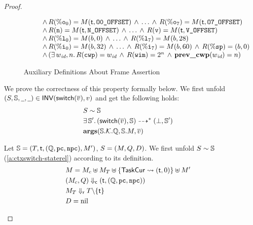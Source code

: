 \begin{proof}
\begin{enumerate}
\begin{figure}[!t]
\[\begin{array}{lcl}
                    & & \, \land \, 
                    R(\%\texttt{o}_{0}) = M(\textsf{t}, \texttt{O0\_OFFSET}) \, \land \, \dots \, \land \, 
                    R(\%\texttt{o}_{7}) = M(\textsf{t}, \texttt{O7\_OFFSET})  \\
                    & & \, \land \, 
                    R(\texttt{n}) = M(\textsf{t}, \texttt{N\_OFFSET}) \, \land \, \dots \, \land \, 
                    R(\texttt{v}) = M(\textsf{t}, \texttt{V\_OFFSET}) \\
                    & & \, \land \, 
                    R(\%\texttt{l}_{0}) = M(b, 0) \, \land \, \dots \, \land \, 
                    R(\%\texttt{l}_{7}) = M(b, 28) \\
                    & & \, \land \, 
                    R(\%\texttt{i}_{0}) = M(b, 32) \, \land \, \dots \, \land \, 
                    R(\%\texttt{i}_{7}) = M(b, 60) \, \land \, 
                    R(\%\texttt{sp}) = (b, 0) \\
                    & & \, \land \, 
                    (\exists \, w_{\textit{id}}, n. \, R(\texttt{cwp}) = w_{\textit{id}} \, \land \, 
                    R(\texttt{wim}) = 2^n \, \land \, \textbf{prev\_cwp}{(w_{\textit{id}})} = n)  
                \end{array}
            \]
            \caption{Auxiliary Definitions About Frame Assertion}
        \end{figure}

        We prove the correctness of this property formally
        below. We first unfold 
        $(S, \mathbb{S}, \underline{\ \,}, \underline{\ \,}) \in \textsf{INV}{(\mathsf{switch}(\overline{v}), v)}$
        and get the following holds:
        \begin{align}
            & {S} \sim {\mathbb{S}} \label{a:ctxswitch-staterel} \\
            & \exists \, \mathbb{S}'. \, 
                {(\mathsf{switch}(\overline{v}), \mathbb{S})} \dashrightarrow^{*} {(\perp, \mathbb{S}')} \label{a:ctxswitch-swtrans} \\
            & \textbf{args}(\mathbb{S}.\mathcal{K}.\mathbb{Q}, \mathbb{S}.M, \overline{v})
        \end{align}

        Let $\mathbb{S} = (T, \textsf{t}, (\mathbb{Q}, \texttt{pc}, \texttt{npc}), M')$, 
        $S = (M, Q, D)$. We first unfold 
        ${S} \sim {\mathbb{S}}$ (\ref{a:ctxswitch-staterel})
        according to its definition. 
        \begin{align}
            & M = M_c \uplus M_T
                \uplus \{ \mathsf{TaskCur} \leadsto (\textsf{t}, 0) \}
                \uplus M' \\
            & {(M_c, Q)} \Downarrow_{\textsf{c}} {(\textsf{t}, (\mathbb{Q}, \texttt{pc}, \texttt{npc}))} \\
            & {M_T} \Downarrow_{\textsf{r}} {T\backslash\{\textsf{t}\}}
                \label{a:ctxswitch-rdyrel} \\
            & D = \text{nil}
        \end{align}


\end{enumerate}
\end{proof}
